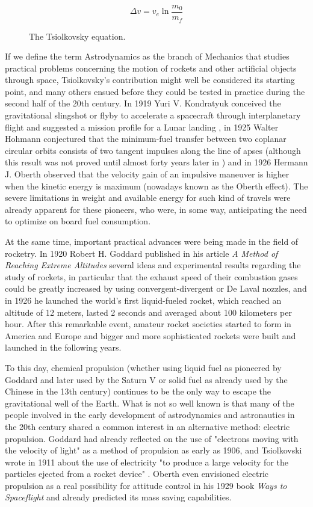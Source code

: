 
\begin{figure}[h]
\[\Delta v = v_e \ln \frac{m_0}{m_f}\]
\caption{The Tsiolkovsky equation.}
\end{figure}

If we define the term Astrodynamics as the branch of Mechanics that studies practical problems concerning the motion of rockets and other artificial objects through space, Tsiolkovsky's contribution might well be considered its starting point, and many others ensued before they could be tested in practice during the second half of the 20th century. In 1919 Yuri V. Kondratyuk conceived the gravitational slingshot or flyby to accelerate a spacecraft through interplanetary flight and suggested a mission profile for a Lunar landing \cite{siddiqi2000challenge}, in 1925 Walter Hohmann conjectured that the minimum-fuel transfer between two coplanar circular orbits consists of two tangent impulses along the line of apses (although this result was not proved until almost forty years later in \cite{lawden1963optimal}) and in 1926 Hermann J. Oberth observed that the velocity gain of an impulsive maneuver is higher when the kinetic energy is maximum (nowadays known as the Oberth effect). The severe limitations in weight and available energy for such kind of travels were already apparent for these pioneers, who were, in some way, anticipating the need to optimize on board fuel consumption.

At the same time, important practical advances were being made in the field of rocketry. In 1920 Robert H. Goddard published in his article \textit{A Method of Reaching Extreme Altitudes} several ideas and experimental results regarding the study of rockets, in particular that the exhaust speed of their combustion gases could be greatly increased by using convergent-divergent or De Laval nozzles, and in 1926 he launched the world's first liquid-fueled rocket, which reached an altitude of 12 meters, lasted 2 seconds and averaged about 100 kilometers per hour. After this remarkable event, amateur rocket societies started to form in America and Europe and bigger and more sophisticated rockets were built and launched in the following years.

To this day, chemical propulsion (whether using liquid fuel as pioneered by Goddard and later used by the Saturn V or solid fuel as already used by the Chinese in the 13th century) continues to be the only way to escape the gravitational well of the Earth. What is not so well known is that many of the people involved in the early development of astrodynamics and astronautics in the 20th century shared a common interest in an alternative method: electric propulsion. Goddard had already reflected on the use of "electrons moving with the velocity of light" as a method of propulsion as early as 1906, and Tsiolkovski wrote in 1911 about the use of electricity "to produce a large velocity for the particles ejected from a rocket device" \cite{choueiri2004history}. Oberth even envisioned electric propulsion as a real possibility for attitude control in his 1929 book \textit{Ways to Spaceflight} and already predicted its mass saving capabilities.

